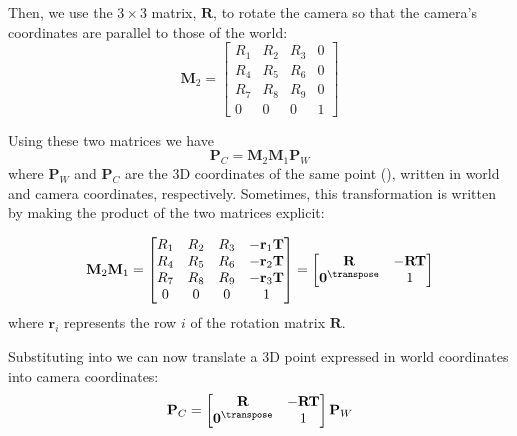 Then, we use the $3\times 3$ matrix, $\mathbf{R}$, to rotate the camera so that the camera's coordinates are parallel to those of the world:
\begin{equation}
\mathbf{M}_2 =         
    \begin{bmatrix}
    R_1 & R_2 & R_3  & 0 \\
    R_4 & R_5 & R_6 & 0 \\
    R_7 & R_8 & R_9 & 0 \\
    0 & 0 & 0 & 1
    \end{bmatrix}
    \label{eq:homographyRotation}
\end{equation}


Using these two matrices we have
\begin{equation}
\mathbf{P}_C = \mathbf{M}_2 \mathbf{M}_1 \mathbf{P}_W
\label{eq:extrinsic}
\end{equation}
where $\mathbf{P}_W$ and $\mathbf{P}_C$ are the 3D coordinates of the same point (\fig{\ref{fig:camera_calibration}}), written in world and camera coordinates, respectively. Sometimes, this transformation is written by making the product of the two matrices explicit:

\begin{equation}
\mathbf{M}_2 \mathbf{M}_1=         
    \begin{bmatrix}
    R_1 & R_2 & R_3  & -\mathbf{r}_1 \mathbf{T} \\
    R_4 & R_5 & R_6 & - \mathbf{r}_2 \mathbf{T} \\
    R_7 & R_8 & R_9 & - \mathbf{r}_3 \mathbf{T} \\
    0 & 0 & 0 & 1
    \end{bmatrix}
    =
    \begin{bmatrix}
    \mathbf{R} & -\mathbf{R}\mathbf{T} \\
    \mathbf{0}^\transpose & 1
    \end{bmatrix}
\label{eq:extrinsic2}
\end{equation}
where $\mathbf{r}_i$ represents the row $i$ of the rotation matrix $\mathbf{R}$. 

Substituting \eqn{\ref{eq:extrinsic2}} into \eqn{\ref{eq:extrinsic}} we can now translate a 3D point expressed in world coordinates into camera coordinates:
\begin{equation}
\mathbf{P}_C = 
    \begin{bmatrix}
    \mathbf{R} & -\mathbf{R}\mathbf{T} \\
    \mathbf{0}^\transpose & 1
    \end{bmatrix}
    \mathbf{P}_W
\end{equation}

